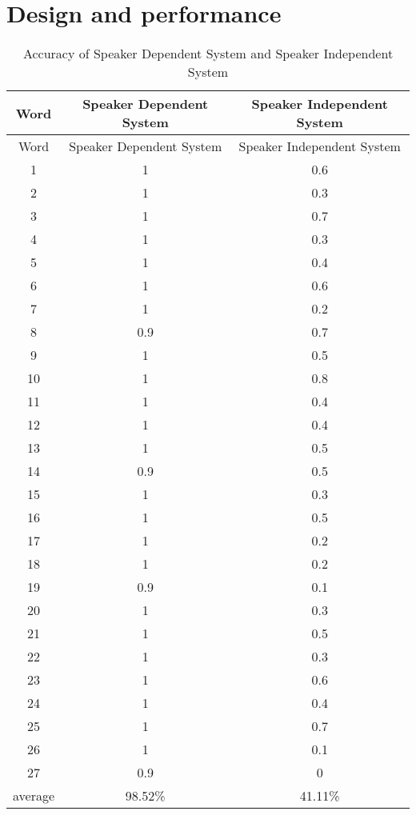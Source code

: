 
\section{Design and performance}

\begin{longtable}[c]{|c|c|c|}
\caption {Accuracy of Speaker Dependent System and Speaker Independent System\label{table 3}}\\

\hline
Word & Speaker Dependent System  & Speaker Independent System \\
\hline
\endfirsthead

\hline
Word & Speaker Dependent System  & Speaker Independent System \\
\hline
\endhead

\hline
\endfoot

\hline
\endlastfoot

1& 1 & 0.6\\
\hline
2& 1 &  0.3\\
\hline
3& 1&  0.7\\
\hline
4& 1& 0.3\\
\hline
5& 1& 0.4\\
\hline
6& 1 &  0.6 \\
\hline
7& 1 &   0.2\\
\hline
8& 0.9 &   0.7\\
\hline
9&1 &   0.5\\
\hline
10&1 &  0.8\\
\hline
11& 1 &  0.4\\
\hline
12& 1 &   0.4\\
\hline
13& 1 &   0.5\\
\hline
14& 0.9 & 0.5\\
\hline
15& 1 &  0.3 \\
\hline
16& 1 &  0.5 \\
\hline
17& 1 &  0.2\\
\hline
18& 1 &   0.2\\
\hline
19&0.9& 0.1\\
\hline
20&1 &   0.3\\
\hline
21&1 &  0.5\\
\hline
22& 1 &  0.3\\
\hline
23& 1 &  0.6\\
\hline
24& 1 &   0.4\\
\hline
25& 1 &   0.7\\
\hline
26& 1 &  0.1\\
\hline
27& 0.9 &  0\\
\hline
average & 98.52\% & 41.11\% \\
\end{longtable}


